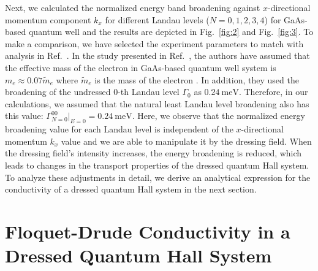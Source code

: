 \documentclass[
 reprint,
 amsmath,amssymb,
 aps,
 prb,
]{revtex4-2}
\begin{document}
Next, we calculated the normalized energy band broadening against $x$-directional momentum component ${k_x}$ for different Landau levels ($N = 0,1,2,3,4$) for GaAs-based quantum well and the results are depicted in Fig.~\ref{fig:2} and Fig.~\ref{fig:3}. To make a comparison, we have selected the experiment parameters to match with analysis in Ref.~\cite{endo09}.
{\color{Red}In the study presented in Ref.~\cite{endo09}, the authors have assumed that the effective mass of the electron in GaAs-based quantum well system is $m_e \approx 0.07\widetilde{m}_e$ where $\widetilde{m}_e$ is the mass of the electron \cite{endo09,winkler03,wackerl20}.} In addition, they used the broadening of the undressed $0$-th Landau level $\Gamma_0$ as $\SI{0.24}{\milli\eV}$. Therefore, in our calculations, we assumed that the natural least Landau level broadening also has this value: $\Gamma^{00}_{N=0}|_{E=0} = \SI{0.24}{\milli\eV}$.
Here, we observe that the normalized energy broadening value for each Landau level is independent of the $x$-directional momentum $k_x$ value and we are able to manipulate it by the dressing field. When the dressing field's intensity increases, the energy broadening is reduced, which leads to changes in the transport properties of the dressed quantum Hall system.
To analyze these adjustments in detail, we derive an analytical expression for the conductivity of a dressed quantum Hall system in the next section.

\section{\label{sec:floquet_drude_conductivity} Floquet-Drude Conductivity in a Dressed Quantum Hall System}
\end{document}
